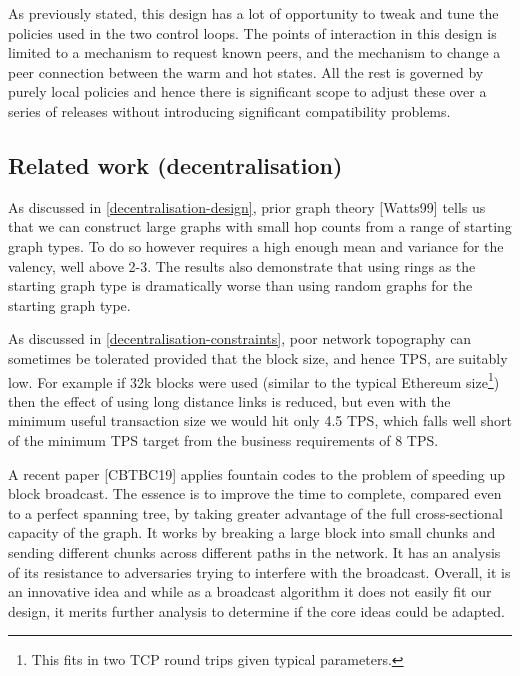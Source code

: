 \documentclass[11pt,a4paper]{article}
\begin{document}
As previously stated, this design has a lot of opportunity to tweak and
tune the policies used in the two control loops. The points of
interaction in this design is limited to a mechanism to request known
peers, and the mechanism to change a peer connection between the warm
and hot states. All the rest is governed by purely local policies and
hence there is significant scope to adjust these over a series of
releases without introducing significant compatibility problems.

\subsection{Related work (decentralisation)}
\label{related-work-decentralisation}


As discussed in \cref{decentralisation-design}, prior graph theory {[}Watts99{]} tells us that we can construct
large graphs with small hop counts from a range of starting graph types.
To do so however requires a high enough mean and variance for the
valency, well above 2-3. The results also demonstrate that using rings
as the starting graph type is dramatically worse than using random
graphs for the starting graph type.

As discussed in
\cref{decentralisation-constraints}, poor
network topography can sometimes be tolerated provided that the block
size, and hence TPS, are suitably low. For example if 32k blocks were
used (similar to the typical Ethereum size\footnote{This fits in two TCP
  round trips given typical parameters.}) then the effect of using long
distance links is reduced, but even with the minimum useful transaction
size we would hit only 4.5 TPS, which falls well short of the minimum
TPS target from the business requirements of 8 TPS.

A recent paper {[}CBTBC19{]} applies fountain codes to the problem of
speeding up block broadcast. The essence is to improve the time to
complete, compared even to a perfect spanning tree, by taking greater
advantage of the full cross-sectional capacity of the graph. It works by
breaking a large block into small chunks and sending different chunks
across different paths in the network. It has an analysis of its
resistance to adversaries trying to interfere with the broadcast.
Overall, it is an innovative idea and while as a broadcast algorithm it
does not easily fit our design, it merits further analysis to determine
if the core ideas could be adapted.
\end{document}
